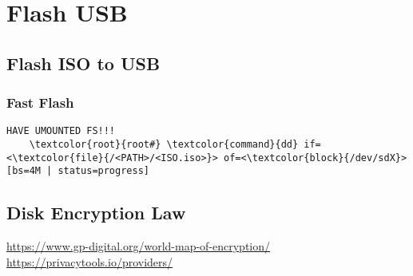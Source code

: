 \documentclass[10pt, a4paper, onecolumn, openany]{book} %
\begin{document}
\chapter{Flash USB}%
\section{Flash ISO to USB}
\subsection{Fast Flash}
\begin{Verbatim}[commandchars=\\\{\}]
HAVE UMOUNTED FS!!!
    \textcolor{root}{root#} \textcolor{command}{dd} if=<\textcolor{file}{/<PATH>/<ISO.iso>}> of=<\textcolor{block}{/dev/sdX}> [bs=4M | status=progress]
\end{Verbatim}

\section{Disk Encryption Law}
\underline{\url{https://www.gp-digital.org/world-map-of-encryption/}}\newline
\underline{\url{https://privacytools.io/providers/}}

%
%
\end{document}
